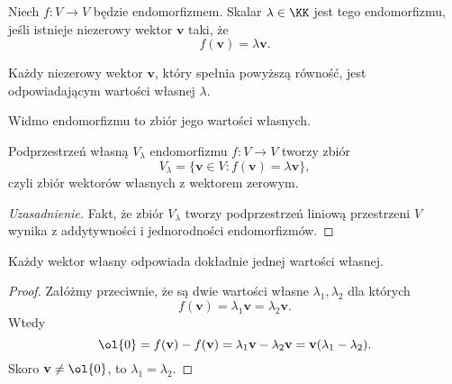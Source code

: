 \begin{definition}
    Niech $f : V \to V$ będzie endomorfizmem. Skalar $\lambda \in \KK$ jest  tego endomorfizmu, jeśli istnieje niezerowy wektor $\mathbf{v}$ taki, że
    \[ f(\mathbf{v}) = \lambda\mathbf{v}. \]

    Każdy niezerowy wektor $\mathbf{v}$, który spełnia powyższą równość, jest  odpowiadającym wartości własnej $\lambda$.
\end{definition}

\begin{definition}
    Widmo endomorfizmu to zbiór jego wartości własnych.
\end{definition}

\begin{definition}
    Podprzestrzeń własną $V_\lambda$ endomorfizmu $f : V \to V$ tworzy zbiór
    \[ V_\lambda = \{\mathbf{v} \in V : f(\mathbf{v}) = \lambda\mathbf{v}\}, \]
    czyli zbiór wektorów własnych z wektorem zerowym.
\end{definition}
\begin{proof}[Uzasadnienie]
    Fakt, że zbiór $V_\lambda$ tworzy podprzestrzeń liniową przestrzeni $V$ wynika z addytywności i jednorodności endomorfizmów.
\end{proof}

\begin{theorem}
    Każdy wektor własny odpowiada dokładnie jednej wartości własnej.
\end{theorem}
\begin{proof}
    Załóżmy przeciwnie, że są dwie wartości własne $\lambda_1, \lambda_2$ dla których
    \[ f(\mathbf{v}) = \lambda_1\mathbf{v} = \lambda_2\mathbf{v}. \]
    Wtedy
    \[ \ol{0} = f(\mathbf{v}) - f(\mathbf{v}) = \lambda_1\mathbf{v} - \lambda_2\mathbf{v} = \mathbf{v}(\lambda_1 - \lambda_2). \]
    Skoro $\mathbf{v} \neq \ol{0}$, to $\lambda_1 = \lambda_2$.
\end{proof}

